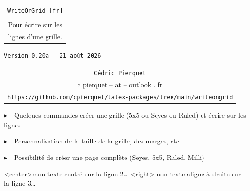 \documentclass[a4paper]{article}
\def\TPversion{0.20a}
\def\TPdate{21 août 2026}
\begin{document}
\pagestyle{fancy}

\thispagestyle{empty}

\vspace{2cm}

\begin{center}
	\begin{minipage}{0.75\linewidth}
	\begin{tcolorbox}[colframe=yellow,colback=yellow!15]
		\begin{center}
			\begin{tabular}{c}
				{\Huge \texttt{WriteOnGrid [fr]}}\\
				\\
				{\LARGE Pour écrire sur les} \\
				{\LARGE lignes d'une grille.}
			\end{tabular}

			\medskip

			{\small \texttt{Version \TPversion{} -- \TPdate}}
		\end{center}
	\end{tcolorbox}
\end{minipage}
\end{center}

\vspace{0.5cm}

\begin{center}
	\begin{tabular}{c}
	\texttt{Cédric Pierquet}\\
	{\ttfamily c pierquet -- at -- outlook . fr}\\
	\texttt{\url{https://github.com/cpierquet/latex-packages/tree/main/writeongrid}}
\end{tabular}
\end{center}

\vspace{0.5cm}

{$\blacktriangleright$~~Quelques commandes créer une grille (5x5 ou Seyes ou Ruled) et écrire \og sur \fg{} les lignes.}

\smallskip

{$\blacktriangleright$~~Personnalisation de la taille de la grille, des marges, etc.}

\smallskip

{$\blacktriangleright$~~Possibilité de créer une page complète (Seyes, 5x5, Ruled, Milli)}

\vspace{1cm}

\begin{center}
	\begin{EnvQuadrillage}[NbCarreaux=22x8]
	\EcrireLigne<center>{mon texte centré sur la ligne 2\ldots}
	\EcrireLigne<right>{mon texte aligné à droite sur la ligne 3\ldots}
	\PasseLigne
\end{EnvQuadrillage}
\end{center}
\end{document}
